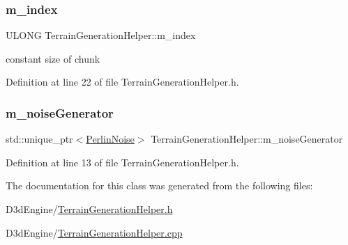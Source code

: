 \subsubsection{\texorpdfstring{m\+\_\+index}{m\_index}}
{\footnotesize\ttfamily U\+L\+O\+NG Terrain\+Generation\+Helper\+::m\+\_\+index\hspace{0.3cm}{\ttfamily [private]}}



constant size of chunk 



Definition at line 22 of file Terrain\+Generation\+Helper.\+h.

\mbox{\label{class_terrain_generation_helper_a2c9870bfe0dbf1a87a864562f28adc20}} 
\subsubsection{\texorpdfstring{m\+\_\+noise\+Generator}{m\_noiseGenerator}}
{\footnotesize\ttfamily std\+::unique\+\_\+ptr$<$\mbox{\hyperlink{class_perlin_noise}{Perlin\+Noise}}$>$ Terrain\+Generation\+Helper\+::m\+\_\+noise\+Generator\hspace{0.3cm}{\ttfamily [private]}}



Definition at line 13 of file Terrain\+Generation\+Helper.\+h.



The documentation for this class was generated from the following files\+:\begin{DoxyCompactItemize}
\item 
D3d\+Engine/\mbox{\hyperlink{_terrain_generation_helper_8h}{Terrain\+Generation\+Helper.\+h}}\item 
D3d\+Engine/\mbox{\hyperlink{_terrain_generation_helper_8cpp}{Terrain\+Generation\+Helper.\+cpp}}\end{DoxyCompactItemize}
